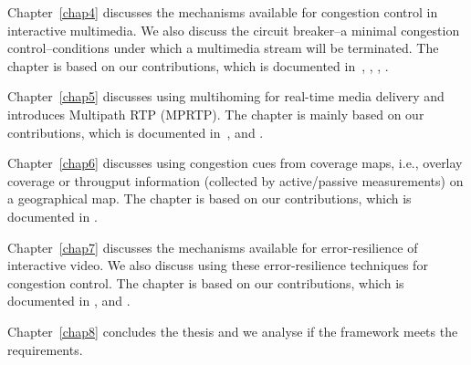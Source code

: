 Chapter~\ref{chap4} discusses the mechanisms available for congestion control
in interactive multimedia. We also discuss the circuit breaker--a minimal
congestion control--conditions under which a multimedia stream will be
terminated. The chapter is based on our contributions, which is documented
in~\cite{draft.rtp.cb, control.loops.api}, , ,
.


Chapter~\ref{chap5} discusses using multihoming for real-time media delivery
and introduces Multipath RTP (MPRTP). The chapter is mainly based on our
contributions, which is documented in~\cite{draft.mprtp, draft.mprtp.sdp,
globisch2011architecture, draft.rtcp.overlay}, and .


Chapter~\ref{chap6} discusses using congestion cues from coverage maps, i.e.,
overlay coverage or througput information (collected by active/passive
measurements) on a geographical map. The chapter is based on our contributions, 
which is documented in .


Chapter~\ref{chap7} discusses the mechanisms available for error-resilience
of interactive video. We also discuss using these error-resilience techniques
for congestion control. The chapter is based on our contributions, which is
documented in , and .


Chapter~\ref{chap8} concludes the thesis and we analyse if the framework meets
the requirements.
